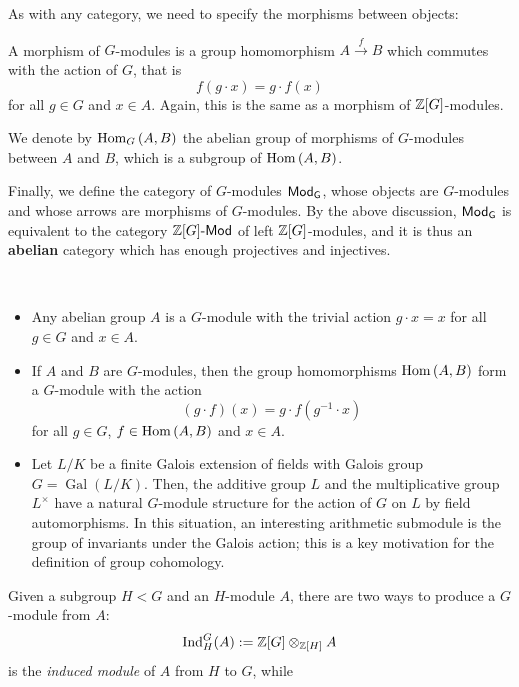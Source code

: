 \documentclass[a4paper, oneside]{memoir}
\begin{document}
As with any category, we need to specify the morphisms between objects:

\begin{definition}
	A morphism of $G$-modules is a group homomorphism $A\overset{f}{\to} B$ which commutes with the action of $G$, that is
	\[
		f(g\cdot x)=g\cdot f(x)
	\]
	for all $g\in G$ and $x\in A$. Again, this is the same as a morphism of $\mathbb{Z}[G]$-modules.
\end{definition}
\noindent We denote by $\operatorname{Hom}_G{(A,B)}$ the abelian group of morphisms of $G$-modules between $A$ and $B$, which is a subgroup of $\operatorname{Hom}{(A,B)}$.

\medskip Finally, we define the category of $G$-modules $\mathsf{Mod}_\mathsf{G}$, whose objects are $G$-modules and whose arrows are morphisms of $G$-modules. By the above discussion, $\mathsf{Mod}_\mathsf{G}$ is equivalent to the category $\mathbb{Z}[G]\text{-}\mathsf{Mod}$ of left $\mathbb{Z}[G]$-modules, and it is thus an \textbf{abelian} category which has enough projectives and injectives.

\begin{example}[$G$-modules]\
	\begin{itemize}
		\item Any abelian group $A$ is a $G$-module with the trivial action $g\cdot x=x$ for all $g\in G$ and $x\in A$.
		\item If $A$ and $B$ are $G$-modules, then the group homomorphisms $\operatorname{Hom}{(A,B)}$ form a $G$-module with the action
		      \[
			      (g\cdot f)(x)=g\cdot f(g^{-1}\cdot x)
		      \]
		      for all $g\in G$, $f\in\operatorname{Hom}{(A,B)}$ and $x\in A$.
		\item Let $L / K$ be a finite Galois extension of fields with Galois group $G=\operatorname{Gal}{(L / K)}$. Then, the additive group $L$ and the multiplicative group $L^\times$ have a natural $G$-module structure for the action of $G$ on $L$ by field automorphisms. In this situation, an interesting arithmetic submodule is the group of invariants under the Galois action; this is a key motivation for the definition of group cohomology.
	\end{itemize}
\end{example}


Given a subgroup $H<G$ and an $H$-module $A$, there are two ways to produce a $G$-module from $A$:
\[
	\mathrm{Ind}^G_H{(A)}:=\mathbb{Z}[G]\otimes_{\mathbb{Z}[H]}{A}
\]
is the \textit{induced module} of $A$ from $H$ to $G$, while
\end{document}
